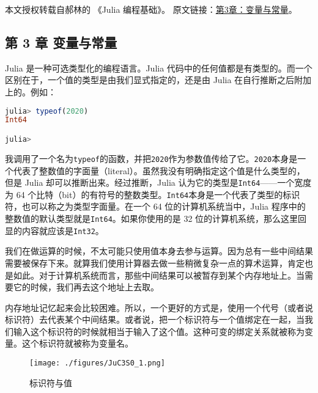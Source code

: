 
本文授权转载自郝林的 《Julia 编程基础》。 原文链接：\href{https://github.com/hyper0x/JuliaBasics/blob/master/book/ch03.md}{第3章：变量与常量}。


\subsection{第 3 章 变量与常量}

Julia 是一种可选类型化的编程语言。Julia 代码中的任何值都是有类型的。而一个区别在于，一个值的类型是由我们显式指定的，还是由 Julia 在自行推断之后附加上的。例如：

\begin{lstlisting}[language=julia]
julia> typeof(2020)
Int64

julia> 
\end{lstlisting}

我调用了一个名为\verb|typeof|的函数，并把\verb|2020|作为参数值传给了它。\verb|2020|本身是一个代表了整数值的字面量（literal）。虽然我没有明确指定这个值是什么类型的，但是 Julia 却可以推断出来。经过推断，Julia 认为它的类型是\verb|Int64|——一个宽度为 64 个比特（bit）的有符号的整数类型。\verb|Int64|本身是一个代表了类型的标识符，也可以称之为类型字面量。在一个 64 位的计算机系统当中，Julia 程序中的整数值的默认类型就是\verb|Int64|。如果你使用的是 32 位的计算机系统，那么这里回显的内容就应该是\verb|Int32|。

我们在做运算的时候，不太可能只使用值本身去参与运算。因为总有一些中间结果需要被保存下来。就算我们使用计算器去做一些稍微复杂一点的算术运算，肯定也是如此。对于计算机系统而言，那些中间结果可以被暂存到某个内存地址上。当需要它的时候，我们再去这个地址上去取。

内存地址记忆起来会比较困难。所以，一个更好的方式是，使用一个代号（或者说标识符）去代表某个中间结果。或者说，把一个标识符与一个值绑定在一起，当我们输入这个标识符的时候就相当于输入了这个值。这种可变的绑定关系就被称为变量。这个标识符就被称为变量名。

\begin{figure}[ht]
\centering
\texttt{[image: ./figures/JuC3S0\_1.png]}
\caption{标识符与值} \label{JuC3S0_fig1}
\end{figure}